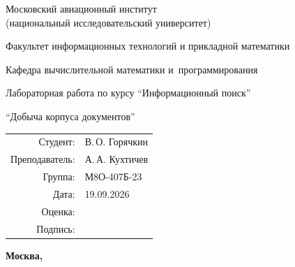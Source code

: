 \begin{titlepage}
\begin{center}
\bfseries

{\Large Московский авиационный институт\\ (национальный исследовательский университет)

}

\vspace{48pt}

{\large Факультет информационных технологий и прикладной математики
}

\vspace{36pt}

{\large Кафедра вычислительной математики и~программирования

}

\vspace{48pt}

Лабораторная работа  по курсу \enquote{Информационный поиск}

\vspace{12pt}

{\large \enquote{Добыча корпуса документов}}

\end{center}

\vspace{72pt}

\begin{flushright}
\begin{tabular}{rl}
Студент: & В.\,О. Горячкин \\
Преподаватель: & А.\,А. Кухтичев \\
Группа: & М8О-407Б-23 \\
Дата: & 19.09.2026 \\
Оценка: & \\
Подпись: & \\
\end{tabular}
\end{flushright}

\vfill

\begin{center}
\bfseries
Москва, \the\year
\end{center}
\end{titlepage}

\pagebreak
